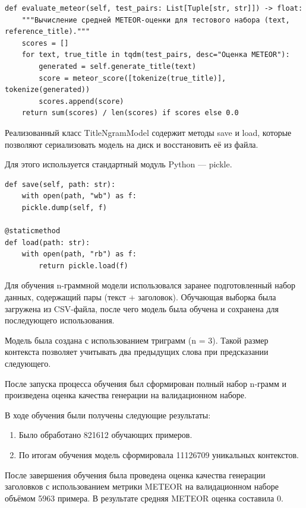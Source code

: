 \documentclass[coursework]{SCWorks}
\begin{document}
    \begin{verbatim}
def evaluate_meteor(self, test_pairs: List[Tuple[str, str]]) -> float:
    """Вычисление средней METEOR-оценки для тестового набора (text, reference_title)."""
    scores = []
    for text, true_title in tqdm(test_pairs, desc="Оценка METEOR"):
        generated = self.generate_title(text)
        score = meteor_score([tokenize(true_title)], tokenize(generated))
        scores.append(score)
    return sum(scores) / len(scores) if scores else 0.0
    \end{verbatim}


    Реализованный класс TitleNgramModel содержит методы save и load, которые позволяют сериализовать
    модель на диск и восстановить её из файла.

    Для этого используется стандартный модуль Python — pickle.
    \begin{verbatim}
def save(self, path: str):
    with open(path, "wb") as f:
    pickle.dump(self, f)

@staticmethod
def load(path: str):
    with open(path, "rb") as f:
        return pickle.load(f)
    \end{verbatim}

    Для обучения n-граммной модели использовался заранее подготовленный набор данных, содержащий пары (текст + заголовок).
    Обучающая выборка была загружена из CSV-файла, после чего модель была обучена и сохранена для последующего использования.

    Модель была создана с использованием триграмм (n = 3).
    Такой размер контекста позволяет учитывать два предыдущих слова при предсказании следующего.

    После запуска процесса обучения был сформирован полный набор n-грамм и произведена оценка качества генерации на
    валидационном наборе.

    В ходе обучения были получены следующие результаты:

    \begin{enumerate}
        \item Было обработано 821612 обучающих примеров.
        \item По итогам обучения модель сформировала 11126709 уникальных контекстов.
    \end{enumerate}


    После завершения обучения была проведена оценка качества генерации заголовков с использованием метрики METEOR на
    валидационном наборе объёмом 5963 примера.
    В результате средняя METEOR оценка составила 0.
\end{document}
